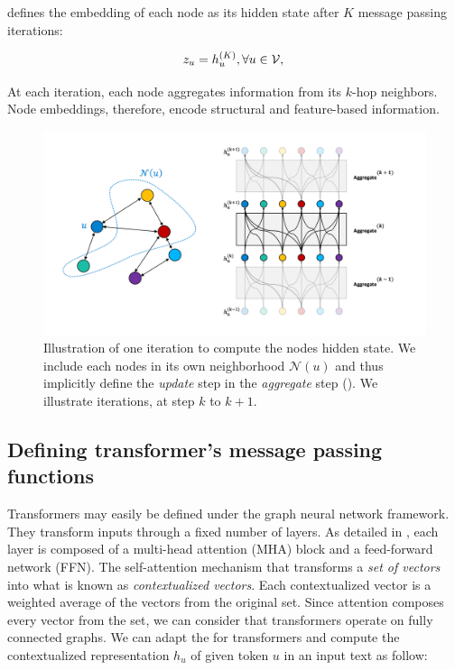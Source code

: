  defines the embedding of each node as its hidden state after $K$ message passing iterations:

\begin{equation}
    z_u = h_u^{(K)}, \forall u \in \mathcal{V}, \labeq{embeddings}\\
\end{equation}

At each iteration, each node aggregates information from its $k$-hop neighbors. Node embeddings, therefore, encode structural and feature-based information.

\begin{figure}[!htb]
\begin{center}
\includegraphics[width=16cm]{images/graph_update_7.png}
\end{center}
\caption{Illustration of one iteration to compute the nodes hidden state. We include each nodes in its own neighborhood $\mathcal{N}(u)$ and thus implicitly define the \textit{update} step in the \textit{aggregate} step (). We illustrate iterations, at step $k$ to $k+1$.}
\end{figure}

\subsection{Defining transformer's message passing functions}

Transformers \parencite{vaswani_17} may easily be defined under the graph neural network framework. 
They transform inputs through a fixed number of layers.
As detailed in , each layer is composed of a multi-head attention (MHA) block and a feed-forward network (FFN).
The self-attention mechanism that transforms a \textit{set of vectors} into what is known as \textit{contextualized vectors}. 
Each contextualized vector is a weighted average of the vectors from the original set.
Since attention composes every vector from the set, we can consider that transformers operate on fully connected graphs.
We can adapt the  for transformers and compute the contextualized representation $h_u$ of given token $u$ in an input text as follow:

